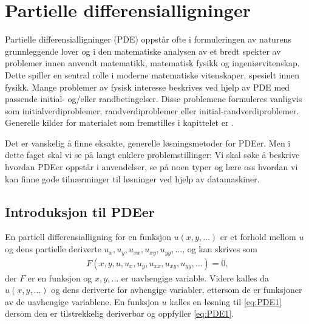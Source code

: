 \chapter{Partielle differensialligninger}
\label{sect:PDE}

Partielle differensialligninger (PDE) oppstår ofte i formuleringen av naturens grunnleggende lover og i den matematiske analysen av et bredt spekter av problemer innen anvendt matematikk, matematisk fysikk og ingeniørvitenskap. Dette spiller en sentral rolle i moderne matematiske vitenskaper, spesielt innen fysikk. Mange problemer av fysisk interesse beskrives ved hjelp av PDE med passende initial- og/eller randbetingelser. Disse problemene formuleres vanligvis som initialverdiproblemer, randverdiproblemer eller initial-randverdiproblemer. Generelle kilder for materialet som fremstilles i kapittelet er \cite{Deb12,LaT03}.

Det er vanskelig å finne eksakte, generelle løsningsmetoder for PDEer. Men i dette faget skal vi se på langt enklere problemstillinger: Vi skal søke å beskrive hvordan PDEer oppstår i anvendelser, se på noen typer og lære oss hvordan vi kan finne gode tilnærminger til løsninger ved hjelp av datamaskiner. 

\section{Introduksjon til PDEer}\label{sect:introPDE}

En partiell differensialligning for en funksjon \( u(x, y, \ldots) \) er et forhold mellom \( u \) og dens partielle deriverte \( u_x, u_y, u_{xx}, u_{xy}, u_{yy}, \ldots \), og kan skrives som
\begin{align}\label{eq:PDE1}
F(x, y, u, u_x, u_y, u_{xx}, u_{xy}, u_{yy}, \ldots) = 0, 
\end{align}
der \( F \) er en funksjon og \( x, y, \ldots \) er uavhengige variable. Videre kalles da \( u(x, y, \ldots) \) og dens deriverte for avhengige variabler, ettersom de er funksjoner av de uavhengige variablene. En funksjon $u$ kalles en løsning til \eqref{eq:PDE1} dersom den er tilstrekkelig deriverbar og oppfyller \eqref{eq:PDE1}.

